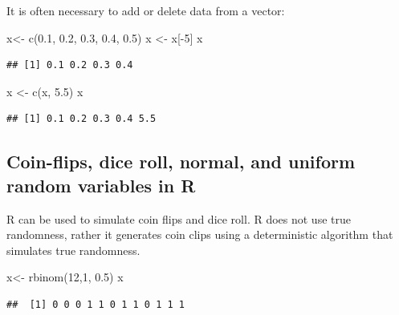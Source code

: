 \documentclass[
]{article}
\newenvironment{Shaded}{\begin{snugshade}}{\end{snugshade}}
\newcommand{\DecValTok}[1]{\textcolor[rgb]{0.00,0.00,0.81}{#1}}
\newcommand{\FloatTok}[1]{\textcolor[rgb]{0.00,0.00,0.81}{#1}}
\newcommand{\FunctionTok}[1]{\textcolor[rgb]{0.00,0.00,0.00}{#1}}
\newcommand{\NormalTok}[1]{#1}
\newcommand{\OtherTok}[1]{\textcolor[rgb]{0.56,0.35,0.01}{#1}}
\newcommand{\SpecialCharTok}[1]{\textcolor[rgb]{0.00,0.00,0.00}{#1}}
\theoremstyle{definition}
\theoremstyle{definition}
\theoremstyle{definition}
\theoremstyle{remark}
\begin{document}
It is often necessary to add or delete data from a vector:

\begin{Shaded}
\begin{Highlighting}[]
\NormalTok{x}\OtherTok{\textless{}{-}} \FunctionTok{c}\NormalTok{(}\FloatTok{0.1}\NormalTok{, }\FloatTok{0.2}\NormalTok{, }\FloatTok{0.3}\NormalTok{, }\FloatTok{0.4}\NormalTok{, }\FloatTok{0.5}\NormalTok{)}
\NormalTok{x }\OtherTok{\textless{}{-}}\NormalTok{ x[}\SpecialCharTok{{-}}\DecValTok{5}\NormalTok{]}
\NormalTok{x}
\end{Highlighting}
\end{Shaded}

\begin{verbatim}
## [1] 0.1 0.2 0.3 0.4
\end{verbatim}

\begin{Shaded}
\begin{Highlighting}[]
\NormalTok{x }\OtherTok{\textless{}{-}} \FunctionTok{c}\NormalTok{(x, }\FloatTok{5.5}\NormalTok{)}
\NormalTok{x}
\end{Highlighting}
\end{Shaded}

\begin{verbatim}
## [1] 0.1 0.2 0.3 0.4 5.5
\end{verbatim}

\hypertarget{coin-flips-dice-roll-normal-and-uniform-random-variables-in-r}{%
\subsection{Coin-flips, dice roll, normal, and uniform random variables in R}\label{coin-flips-dice-roll-normal-and-uniform-random-variables-in-r}}

R can be used to simulate coin flips and dice roll. R does not use true randomness, rather it generates coin clips using a deterministic algorithm that simulates true randomness.

\begin{Shaded}
\begin{Highlighting}[]
\NormalTok{x}\OtherTok{\textless{}{-}} \FunctionTok{rbinom}\NormalTok{(}\DecValTok{12}\NormalTok{,}\DecValTok{1}\NormalTok{, }\FloatTok{0.5}\NormalTok{)}
\NormalTok{x}
\end{Highlighting}
\end{Shaded}

\begin{verbatim}
##  [1] 0 0 0 1 1 0 1 1 0 1 1 1
\end{verbatim}
\end{document}
